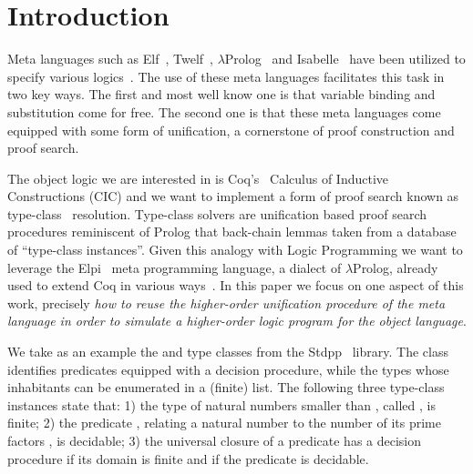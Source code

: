 \documentclass[sigconf,natbib=false,review]{acmart}
\begin{document}

\maketitle

\section{Introduction}
\label{sec:intro}

Meta languages such as Elf~\cite{elf}, Twelf~\cite{twelf},
$\lambda$Prolog~\cite{miller_nadathur_2012} and
Isabelle~\cite{10.1007/978-3-540-71067-7_7}
have been utilized to specify various
logics~\cite{felty88cade,books/sp/NipkowPW02,10.1007/BF00881873,felty93lics}.
The use of these meta languages facilitates this task in two
key ways. The first and most well know one is that variable binding and
substitution come for free. %
The second one is that these meta languages come equipped with some form
of unification, a cornerstone of proof construction and proof search.

The object logic we are interested in is Coq's~\cite{Coq-refman}
Calculus of Inductive Constructions (CIC) and we want to implement a
form of proof search known as type-class~\cite{wadler89,sozeau08} resolution.
Type-class solvers are unification based proof search procedures
reminiscent of Prolog that back-chain lemmas taken
from a database of ``type-class instances''. Given this
analogy with Logic Programming we want to leverage the
Elpi~\cite{tassi:hal-01637063} meta programming language,
a dialect of $\lambda$Prolog, already used to extend
Coq in various ways~\cite{tassi:hal-01637063,tassi:hal-01897468,gregoire:hal-03800154,newtc}.
In this paper we focus on one aspect of
this work, precisely \emph{how to reuse the higher-order unification procedure
of the meta language in order to simulate a higher-order logic program
for the object language}.

We take as an example the  and  type classes
from the Stdpp~\cite{JUNG_KREBBERS_JOURDAN_BIZJAK_BIRKEDAL_DREYER_2018}
library. The class  
identifies predicates equipped with a decision procedure, while
 the types whose inhabitants can be enumerated in a (finite) list.
The following three type-class instances state that:
1) the type of natural numbers smaller than , called ,
is finite;
2) the predicate , relating a natural number
 to the number of its prime factors , is decidable;
3) the universal closure of a predicate has a decision procedure if
its domain is finite and if the predicate is decidable.
\end{document}
